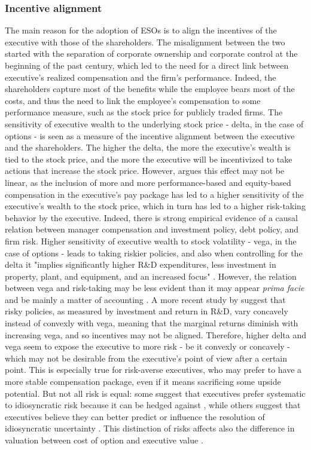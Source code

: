 \subsubsection{Incentive alignment} 
    The main reason for the adoption of ESOs is to align the incentives of the executive with those of the shareholders. The misalignment between the two started with the separation of corporate ownership and corporate control at the beginning of the past century, which led to the need for a direct link between executive's realized compensation and the firm's performance. Indeed, the shareholders capture most of the benefits while the employee bears most of the costs, and thus the need to link the employee's compensation to some performance measure, such as the stock price for publicly traded firms. 
    The sensitivity of executive wealth to the underlying stock price - delta, in the case of options - is seen as a measure of the incentive alignment between the executive and the shareholders. The higher the delta, the more the executive's wealth is tied to the stock price, and the more the executive will be incentivized to take actions that increase the stock price. However, \cite{coles2006managerial} argues this effect may not be linear, as the inclusion of more and more performance-based and equity-based compensation in the executive's pay package has led to a higher sensitivity of the executive's wealth to the stock price, which in turn has led to a higher risk-taking behavior by the executive. Indeed, there is strong empirical evidence of a causal relation between manager compensation and investment policy, debt policy, and firm risk. Higher sensitivity of executive wealth to stock volatility - vega, in the case of options - leads to taking riskier policies, and also when controlling for the delta it "implies significantly higher R\&D expenditures, less investment in property, plant, and equipment, and an increased focus" \cite{coles2006managerial}. However, the relation between vega and risk-taking may be less evident than it may appear \textit{prima facie} and be mainly a matter of accounting \cite{hayes2012stock}. A more recent study by \cite{billings2020can} suggest that risky policies, as measured by investment and return in R\&D, vary concavely instead of convexly with vega, meaning that the marginal returns diminish with increasing vega, and so incentives may not be aligned.
    Therefore, higher delta and vega seem to expose the executive to more risk - be it convexly or concavely - which may not be desirable from the executive's point of view after a certain point. This is especially true for risk-averse executives, who may prefer to have a more stable compensation package, even if it means sacrificing some upside potential. But not all risk is equal: some suggest that executives prefer systematic to idiosyncratic risk because it can be hedged against \cite{armstrong2012executive}, while others suggest that executives believe they can better predict or influence the resolution of idiosyncratic uncertainty \cite{heron2017stock}. This distinction of risks affects also the difference in valuation between cost of option and executive value \cite{meulbroek2001efficiency}.

